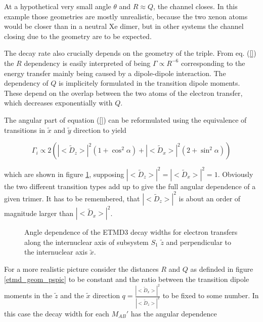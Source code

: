 At a hypothetical very small angle $\theta$ and $R\approx Q$, the channel closes.
In this example those geometries are mostly unrealistic, because the two xenon
atoms would be closer than in a neutral Xe dimer, but in other systems the
channel closing due to the geometry are to be expected.


The decay rate also crucially depends on the geometry of the triple.
From eq. (\ref{}) the $R$ dependency is easily interpreted of being
$\Gamma \propto R^{-6}$ corresponding to the energy transfer mainly being
caused by a dipole-dipole interaction. The dependency of $Q$ is implicitely
formulated in the transition dipole moments. These depend on the overlap
between the two atoms of the electron transfer, which decreases exponentially
with $Q$.



The angular part of equation (\ref{}) can be reformulated using
the equivalence of transitions in $\tilde{x}$ and $\tilde{y}$ direction to
yield

\begin{equation}
  \Gamma_i \propto 2 \left( |<\tilde{D}_{z}>|^2 (1+\cos^2\alpha)
                           + |<\tilde{D}_x>|^2 (2+ \sin^2\alpha) \right)
\end{equation}

which are shown in figure \ref{figure:etmd_angle_dir}, supposing
$|<\tilde{D}_{z}>|^2 = |<\tilde{D}_x>|^2 = 1$.
Obviously the two different transition types add up to give the full
angular dependence of a given trimer. It has to be remembered, that
$|<\tilde{D}_{z}>|^2$ is about an order of magnitude larger than
$|<\tilde{D}_{x}>|^2$.

\begin{figure}[h]
 \centering
 
 \caption{Angle dependence of the ETMD3 decay widths for electron transfers
          along the internuclear axis of subsystem $S_1$ $\tilde{z}$ and perpendicular
          to the internuclear axis $\tilde{x}$.}
 \label{figure:etmd_angle_dir}
\end{figure}

For a more realistic picture
consider the distances $R$ and $Q$ as definded in figure \ref{etmd_geom_pspic}
to be constant and the ratio between the transition dipole moments
in the $\tilde{z}$ and the $\tilde{x}$ direction
$q=\frac{|<\tilde{D}_x>|^2}{|<\tilde{D}_z>|^2}$ to be fixed to some number.
In this case the decay width for each $M_{AB}'$ has the angular dependence

